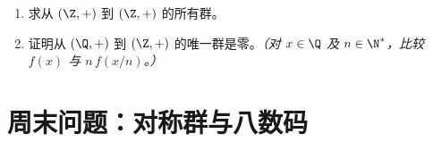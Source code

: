 \begin{exercise}[$\star\star$]\label{exo:b1:structures:12}
\begin{enumerate}
  \item 求从 $(\Z, +)$ 到 $(\Z, +)$ 的所有群。
  \item 证明从 $(\Q, +)$ 到
        $(\Z, +)$ 的唯一群是零。\emph{（对 $x \in \Q$ 及
        $n \in \N^*$，比较 $f(x)$ 与 $n\,f(x/n)$。）}
\end{enumerate}
\end{exercise}

\section{周末问题：对称群与八数码}

